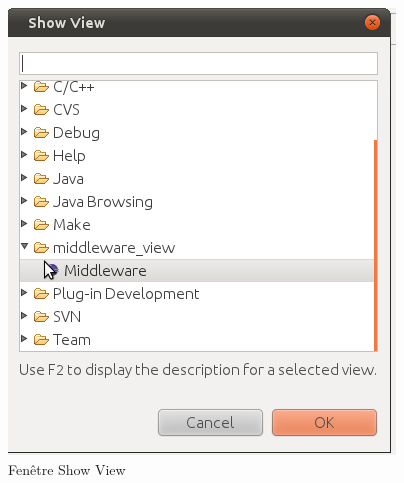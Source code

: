   \begin{figure}
	  \centering
	  \includegraphics[scale=0.50]{img/ShowView}
	  \caption{Fenêtre Show View}
	  \label{fig:ShowView}
\end{figure}



